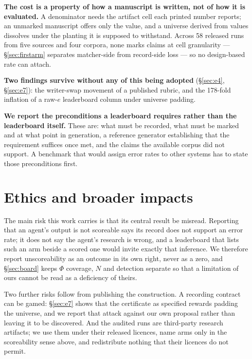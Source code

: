 \documentclass[10pt]{article}
\newcommand{\RM}[1]{{#1}}
\begin{document}
\textbf{The cost is a property of how a manuscript is written, not of how it is
evaluated.} A denominator needs the artifact cell each printed number reports;
an unmarked manuscript offers only the value, and a universe derived from values
dissolves under the planting it is supposed to withstand. Across \RM{58}
released runs from five sources and four corpora, none marks claims at cell
granularity --- \S\ref{sec:firstarm} separates matcher-side from record-side
loss --- so no design-based rate can attach.

\textbf{Two findings survive without any of this being adopted}
(\S\ref{sec:e4}, \S\ref{sec:e7}): the writer-swap movement of a published rubric,
and the \RM{178}-fold inflation of a raw-$e$ leaderboard column under universe
padding.

\textbf{We report the preconditions a leaderboard requires rather than the
leaderboard itself.} These are: what must be recorded, what must be marked and
at what point in generation, a reference generator establishing that the
requirement suffices once met, and the claims the available corpus did not
support. A benchmark that would assign error rates to other systems has to state
those preconditions first.

\section*{Ethics and broader impacts}
The main risk this work carries is that its central result be misread. Reporting
that an agent's output is not scoreable says its record does not support an
error rate; it does not say the agent's research is wrong, and a leaderboard
that lists such an arm beside a scored one would invite exactly that inference.
We therefore report unscoreability as an outcome in its own right, never as a
zero, and \S\ref{sec:board} keeps $\Phi$ coverage, $N$ and detection separate so
that a limitation of ours cannot be read as a deficiency of theirs.

Two further risks follow from publishing the construction. A recording contract
can be gamed: \S\ref{sec:e7} shows that the certificate as specified rewards
padding the universe, and we report that attack against our own proposal rather
than leaving it to be discovered. And the audited runs are third-party research
artifacts; we use them under their released licences, name arms only in the
scoreability sense above, and redistribute nothing that their licences do not
permit.
\end{document}
